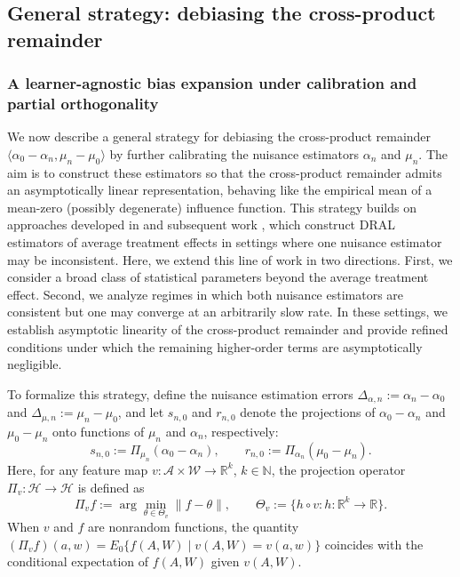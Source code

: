 \documentclass[11pt]{article}
\theoremstyle{plain}
\begin{document}
 
 

\subsection{General strategy: debiasing the cross-product remainder}
\label{sec::genstrat}

\subsubsection{A learner-agnostic bias expansion under calibration and partial orthogonality}


We now describe a general strategy for debiasing the cross-product
remainder $\langle \alpha_0 - \alpha_n, \mu_n - \mu_0 \rangle$ by
further calibrating the nuisance estimators $\alpha_n$ and $\mu_n$.
The aim is to construct these estimators so that the cross-product
remainder admits an asymptotically linear representation, behaving like
the empirical mean of a mean-zero (possibly degenerate) influence
function. This strategy builds on approaches developed in
\cite{van2014targeted} and subsequent work
\citep{benkeser2017doubly, diaz2017doubly, diaz2019statistical, dukes2024doubly},
which construct DRAL estimators of average treatment effects in settings
where one nuisance estimator may be inconsistent. Here, we extend this line of work in two directions. First, we consider a
broad class of statistical parameters beyond the average treatment
effect. Second, we analyze regimes in which both nuisance estimators are
consistent but one may converge at an arbitrarily slow rate. In these settings, we
establish asymptotic linearity of the cross-product remainder and provide
refined conditions under which the remaining higher-order terms are
asymptotically negligible.


 
To formalize this strategy, define the nuisance estimation errors
\(\Delta_{\alpha,n} := \alpha_n - \alpha_0\) and
\(\Delta_{\mu,n} := \mu_n - \mu_0\), and let \(s_{n,0}\) and \(r_{n,0}\) denote
the projections of \(\alpha_0-\alpha_n\) and \(\mu_0-\mu_n\) onto functions of
\(\mu_n\) and \(\alpha_n\), respectively:
\[
s_{n,0} := \Pi_{\mu_n}(\alpha_0 - \alpha_n),
\qquad
r_{n,0} := \Pi_{\alpha_n}(\mu_0 - \mu_n).
\]
Here, for any feature map
$v \colon \mathcal{A} \times \mathcal{W} \to \mathbb{R}^k$, $k \in \mathbb{N}$,
the projection operator $\Pi_v \colon \mathcal{H} \to \mathcal{H}$ is defined as
\[
\Pi_v f := \arg\min_{\theta \in \Theta_v} \|f - \theta\|,
\qquad
\Theta_v := \{ h \circ v : h \colon \mathbb{R}^k \to \mathbb{R} \}.
\]
When $v$ and $f$ are nonrandom functions, the quantity
$(\Pi_v f)(a,w) = E_0\{f(A,W) \mid v(A,W) = v(a,w)\}$ coincides with the
conditional expectation of $f(A,W)$ given $v(A,W)$.
\end{document}
